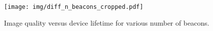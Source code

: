 
\begin{figure}[!htb]
		\vspace{-1em}
	\begin{center}
		\texttt{[image: img/diff\_n\_beacons\_cropped.pdf]}
		\caption{Image quality versus device lifetime for various number of beacons.}
		\label{fig:n_beacons}
	\end{center}
\end{figure}
%
%
%
%
